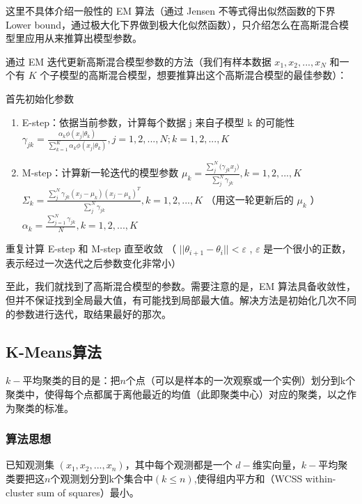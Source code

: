 \documentclass{ML}
\begin{document}
这里不具体介绍一般性的 EM 算法（通过 Jensen 不等式得出似然函数的下界 Lower bound，通过极大化下界做到极大化似然函数），只介绍怎么在高斯混合模型里应用从来推算出模型参数。

通过 EM 迭代更新高斯混合模型参数的方法（我们有样本数据 $x_{1}, x_{2}, ...,x_{N}$ 和一个有 $K$ 个子模型的高斯混合模型，想要推算出这个高斯混合模型的最佳参数）：

首先初始化参数

\begin{enumerate}
	\item E-step：依据当前参数，计算每个数据 j 来自子模型 k 的可能性
	      \subitem $\gamma_{jk} = \frac{\alpha_{k}\phi(x_{j}|\theta_{k})}{\sum_{k=1}^{K}{\alpha_{k}\phi(x_{j}|\theta_{k})}}, j = 1,2,...,N; k = 1,2,...,K$
	\item M-step：计算新一轮迭代的模型参数
	      \subitem $\mu_{k} = \frac{\sum_{j}^{N}{(\gamma_{jk}}x_{j})}{\sum_{j}^{N}{\gamma_{jk}}}, k=1,2,...,K$
	      \subitem $\Sigma_{k} = \frac{\sum_{j}^{N}{\gamma_{jk}}(x_{j}-\mu_{k})(x_{j}-\mu_{k})^{T}}{\sum_{j}^{N}{\gamma_{jk}}}, k = 1,2,...,K$ （用这一轮更新后的 $\mu_{k}$ ）
	      \subitem $\alpha_{k} = \frac{\sum_{j=1}^{N}{\gamma_{jk}}}{N}, k=1,2,...,K$
\end{enumerate}


重复计算 E-step 和 M-step 直至收敛 （ $||\theta_{i+1} - \theta_{i}|| < \varepsilon$ , $\varepsilon$ 是一个很小的正数，表示经过一次迭代之后参数变化非常小）

至此，我们就找到了高斯混合模型的参数。需要注意的是，EM 算法具备收敛性，但并不保证找到全局最大值，有可能找到局部最大值。解决方法是初始化几次不同的参数进行迭代，取结果最好的那次。

\subsection{K-Means算法}

$k-$平均聚类的目的是：把$n$个点（可以是样本的一次观察或一个实例）划分到k个聚类中，使得每个点都属于离他最近的均值（此即聚类中心）对应的聚类，以之作为聚类的标准。

\subsubsection{算法思想}

已知观测集 $(x_{1},x_{2},...,x_{n})$，其中每个观测都是一个 $d-$维实向量，$k-$平均聚类要把这$n$个观测划分到k个集合中$(k ≤ n)$,使得组内平方和（WCSS within-cluster sum of squares）最小。
\end{document}
